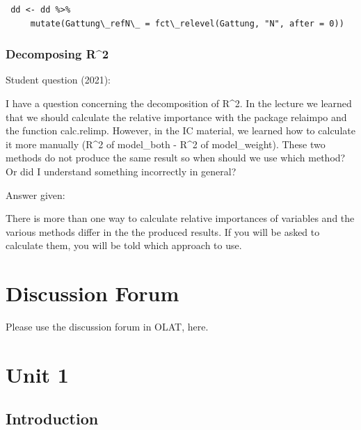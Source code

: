 \documentclass[
  letterpaper,
  8pt,
  a4paper]{book}
\begin{document}
\begin{verbatim}
 dd <- dd %>%
     mutate(Gattung\_refN\_ = fct\_relevel(Gattung, "N", after = 0))
\end{verbatim}

\subsection*{Decomposing R\^{}2}\label{decomposing-r2}

Student question (2021):

I have a question concerning the decomposition of R\^{}2. In the lecture
we learned that we should calculate the relative importance with the
package relaimpo and the function calc.relimp. However, in the IC
material, we learned how to calculate it more manually (R\^{}2 of
model\_both - R\^{}2 of model\_weight). These two methods do not produce
the same result so when should we use which method? Or did I understand
something incorrectly in general?

Answer given:

There is more than one way to calculate relative importances of
variables and the various methods differ in the the produced results. If
you will be asked to calculate them, you will be told which approach to
use.


\chapter*{Discussion Forum}\label{discussion-forum}


Please use the discussion forum in OLAT, here.


\chapter*{Unit 1}\label{unit-1}


\section*{Introduction}\label{introduction-1}
\end{document}
